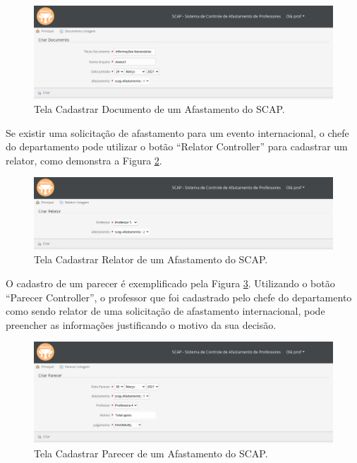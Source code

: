 \begin{figure}[h]
	\centering
	\includegraphics[scale=0.33]{figuras/fig-projeto-cadastrar-documento} 
	\caption{Tela Cadastrar Documento de um Afastamento do SCAP.}
	\label{fig-projeto-cadastrar-documento}
\end{figure}

Se existir uma solicitação de afastamento para um evento internacional, o chefe do departamento pode utilizar o botão ``Relator Controller'' para cadastrar um relator, como demonstra a Figura \ref{fig-projeto-cadastrar-relator}. 

\begin{figure}[h]
	\centering
	\includegraphics[scale=0.33]{figuras/fig-projeto-cadastrar-relator} 
	\caption{Tela Cadastrar Relator de um Afastamento do SCAP.}
	\label{fig-projeto-cadastrar-relator}
\end{figure}

O cadastro de um parecer é exemplificado pela Figura \ref{fig-projeto-cadastrar-parecer}. Utilizando o botão ``Parecer Controller'', o professor que foi cadastrado pelo chefe do departamento como sendo relator de uma solicitação de afastamento internacional, pode preencher as informações justificando o motivo da sua decisão. 

\begin{figure}[h]
	\centering
	\includegraphics[scale=0.33]{figuras/fig-projeto-cadastrar-parecer} 
	\caption{Tela Cadastrar Parecer de um Afastamento do SCAP.}
	\label{fig-projeto-cadastrar-parecer}
\end{figure}

